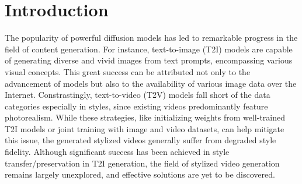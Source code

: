 \section{Introduction}
\label{sec:intro}


The popularity of powerful diffusion models has led to remarkable progress in the field of content generation. For instance, text-to-image (T2I) models are capable of generating diverse and vivid images from text prompts, encompassing various visual concepts. This great success can be attributed not only to the advancement of models but also to the availability of various image data over the Internet.
Constrastingly, text-to-video (T2V) models fall short of the data categories especially in styles, since existing videos predominantly feature photorealism. While these strategies, like initializing weights from well-trained T2I models or joint training with image and video datasets, can help mitigate this issue, the generated stylized videos generally suffer from degraded style fidelity. 
Although significant success has been achieved in style transfer/preservation in T2I generation, the field of stylized video generation remains largely unexplored,
and effective solutions are yet to be discovered.


